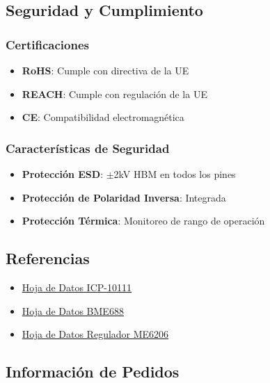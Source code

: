\documentclass[11pt,a4paper]{article}
\begin{document}
\subsection{Seguridad y Cumplimiento}

\subsubsection{Certificaciones}
\begin{itemize}
\item \textbf{RoHS}: Cumple con directiva de la UE
\item \textbf{REACH}: Cumple con regulación de la UE
\item \textbf{CE}: Compatibilidad electromagnética
\end{itemize}

\subsubsection{Características de Seguridad}
\begin{itemize}
\item \textbf{Protección ESD}: $\pm$2kV HBM en todos los pines
\item \textbf{Protección de Polaridad Inversa}: Integrada
\item \textbf{Protección Térmica}: Monitoreo de rango de operación
\end{itemize}

\subsection{Referencias}

\begin{itemize}
\item \href{https://product.tdk.com/system/files/dam/doc/product/sensor/pressure/capacitive-pressure/data_sheet/ds-000177-icp-10111-v1.3.pdf}{Hoja de Datos ICP-10111}
\item \href{https://www.bosch-sensortec.com/media/boschsensortec/downloads/datasheets/bst-bme688-ds000.pdf}{Hoja de Datos BME688}
\item \href{https://www.microne.com.cn/uploads/file/20200904/ME6206.pdf}{Hoja de Datos Regulador ME6206}
\end{itemize}

\subsection{Información de Pedidos}
\end{document}

